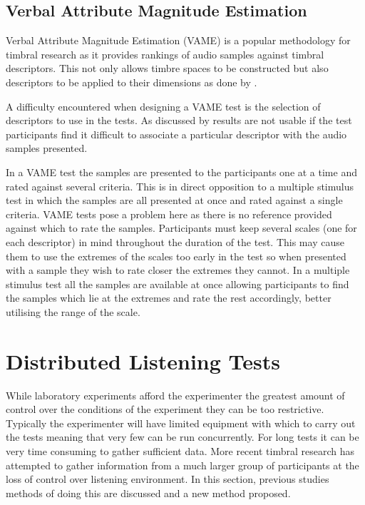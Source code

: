 	\subsection{Verbal Attribute Magnitude Estimation}
	\label{sec:Timbre-LaboratoryListeningTests-VAME}
		Verbal Attribute Magnitude Estimation (VAME) is a popular methodology for timbral research as it provides
		rankings of audio samples against timbral descriptors. This not only allows timbre spaces to be constructed
		but also descriptors to be applied to their dimensions as done by \citet{zacharakis2014an}.

		A difficulty encountered when designing a VAME test is the selection of descriptors to use in the tests. As
		discussed by \citet{darke2005assessment} results are not usable if the test participants find it difficult
		to associate a particular descriptor with the audio samples presented.

		In a VAME test the samples are presented to the participants one at a time and rated against several
		criteria. This is in direct opposition to a multiple stimulus test in which the samples are all presented at
		once and rated against a single criteria. VAME tests pose a problem here as there is no reference provided
		against which to rate the samples. Participants must keep several scales (one for each descriptor) in mind
		throughout the duration of the test. This may cause them to use the extremes of the scales too early in the
		test so when presented with a sample they wish to rate closer the extremes they cannot. In a multiple
		stimulus test all the samples are available at once allowing participants to find the samples which lie at
		the extremes and rate the rest accordingly, better utilising the range of the scale.

\section{Distributed Listening Tests}
\label{sec:Timbre-DistributedListeningTests}
	While laboratory experiments afford the experimenter the greatest amount of control over the conditions of the
	experiment they can be too restrictive. Typically the experimenter will have limited equipment with which to carry
	out the tests meaning that very few can be run concurrently. For long tests it can be very time consuming to gather
	sufficient data. More recent timbral research has attempted to gather information from a much larger group of
	participants at the loss of control over listening environment. In this section, previous studies methods of doing
	this are discussed and a new method proposed.


